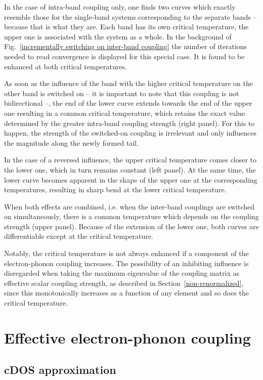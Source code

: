 In the case of intra-band coupling only, one finds two curves which exactly
resemble those for the single-band systems corresponding to the separate bands
-- because that is what they are. Each band has its own critical temperature,
the upper one is associated with the system as a whole. In the background of
Fig.~\ref{incrementally switching on inter-band coupling} the number of
iterations needed to read convergence is displayed for this special case. It is
found to be enhanced at both critical temperatures.

As soon as the influence of the band with the higher critical temperature on the
other band is switched on -- it is important to note that this coupling is not
bidirectional --, the end of the lower curve extends towards the end of the
upper one resulting in a common critical temperature, which retains the exact
value determined by the greater intra-band coupling strength (right panel). For
this to happen, the strength of the switched-on coupling is irrelevant and only
influences the magnitude along the newly formed tail.

In the case of a reversed influence, the upper critical temperature comes closer
to the lower one, which in turn remains constant (left panel). At the same time,
the lower curve becomes apparent in the shape of the upper one at the
corresponding temperatures, resulting in sharp bend at the lower critical
temperature.

When both effects are combined, i.e. when the inter-band couplings are switched
on simultaneously, there is a common temperature which depends on the coupling
strength (upper panel). Because of the extension of the lower one, both curves
are differentiable except at the critical temperature.

Notably, the critical temperature is not always enhanced if a component of the
electron-phonon coupling increases. The possibility of an inhibiting influence
is disregarded when taking the maximum eigenvalue of the coupling matrix as
effective scalar coupling strength, as described in
Section~\ref{non-renormalized}, since this monotonically increases as a function
of any element and so does the critical temperature.

\section{Effective electron-phonon coupling}

\subsection{cDOS approximation}

